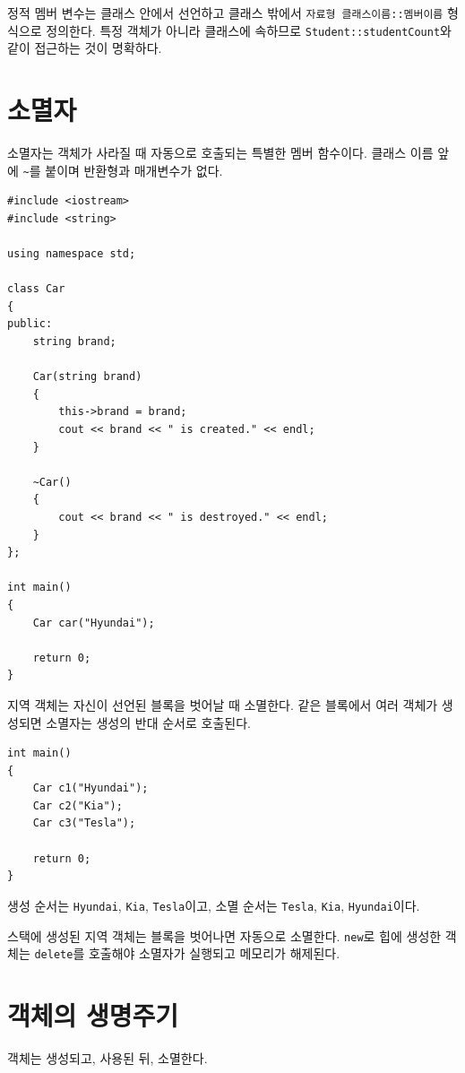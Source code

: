 \documentclass[11pt,a4paper]{article}
\begin{document}
\begin{importantbox}
정적 멤버 변수는 클래스 안에서 선언하고 클래스 밖에서 \texttt{자료형 클래스이름::멤버이름} 형식으로 정의한다. 특정 객체가 아니라 클래스에 속하므로 \texttt{Student::studentCount}와 같이 접근하는 것이 명확하다.
\end{importantbox}

\section{소멸자}
소멸자는 객체가 사라질 때 자동으로 호출되는 특별한 멤버 함수이다. 클래스 이름 앞에 \texttt{\textasciitilde}를 붙이며 반환형과 매개변수가 없다.

\begin{lstlisting}
#include <iostream>
#include <string>

using namespace std;

class Car
{
public:
    string brand;

    Car(string brand)
    {
        this->brand = brand;
        cout << brand << " is created." << endl;
    }

    ~Car()
    {
        cout << brand << " is destroyed." << endl;
    }
};

int main()
{
    Car car("Hyundai");

    return 0;
}
\end{lstlisting}

지역 객체는 자신이 선언된 블록을 벗어날 때 소멸한다. 같은 블록에서 여러 객체가 생성되면 소멸자는 생성의 반대 순서로 호출된다.

\begin{lstlisting}
int main()
{
    Car c1("Hyundai");
    Car c2("Kia");
    Car c3("Tesla");

    return 0;
}
\end{lstlisting}

생성 순서는 \texttt{Hyundai}, \texttt{Kia}, \texttt{Tesla}이고, 소멸 순서는 \texttt{Tesla}, \texttt{Kia}, \texttt{Hyundai}이다.

\begin{importantbox}
스택에 생성된 지역 객체는 블록을 벗어나면 자동으로 소멸한다. \texttt{new}로 힙에 생성한 객체는 \texttt{delete}를 호출해야 소멸자가 실행되고 메모리가 해제된다.
\end{importantbox}

\section{객체의 생명주기}
객체는 생성되고, 사용된 뒤, 소멸한다.
\end{document}
